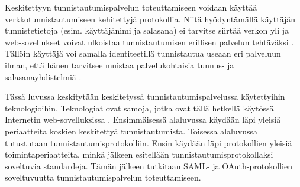 Keskitettyyn tunnistautumispalvelun toteuttamiseen voidaan käyttää verkkotunnistautumiseen kehitettyjä protokollia. Niitä hyödyntämällä käyttäjän tunnistetietoja (esim. käyttäjänimi ja salasana) ei tarvitse siirtää verkon yli ja web-sovellukset voivat ulkoistaa tunnistautumisen erillisen palvelun tehtäväksi \cite{nisti}. Tällöin käyttäjä voi samalla identiteetillä tunnistautua useaan eri palveluun ilman, että hänen tarvitsee muistaa palvelukohtaisia tunnus- ja salasanayhdistelmiä \cite{open_identity}.

Tässä luvussa keskitytään keskitetyssä tunnistautumispalvelussa käytettyihin teknologioihin. Teknologiat ovat samoja, jotka ovat tällä hetkellä käytössä Internetin web-sovelluksissa \cite{facebook}. Ensimmäisessä alaluvussa käydään läpi yleisiä periaatteita koskien keskitettyä tunnistautumista. Toisessa alaluvussa tutustutaan tunnistautumisprotokolliin. Ensin käydään läpi protokollien yleisiä toimintaperiaatteita, minkä jälkeen esitellään tunnistautumisprotokollaksi soveltuvia standardeja. Tämän jälkeen tutkitaan SAML- ja OAuth-protokollien soveltuvuutta tunnistautumispalvelun toteuttamiseen.